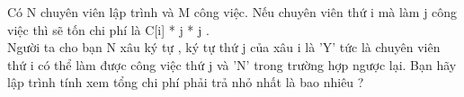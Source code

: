 Có N chuyên viên lập trình và M công việc. Nếu chuyên viên thứ i mà làm j công việc thì sẽ tốn chi phí là C[i] * j * j .   
\\   Người ta cho bạn N xâu ký tự , ký tự thứ j của xâu i là 'Y' tức là chuyên viên thứ i có thể làm được công việc thứ j và 'N' trong trường hợp ngược lại. Bạn hãy lập trình tính xem tổng chi phí phải trả nhỏ nhất là bao nhiêu ?  

\